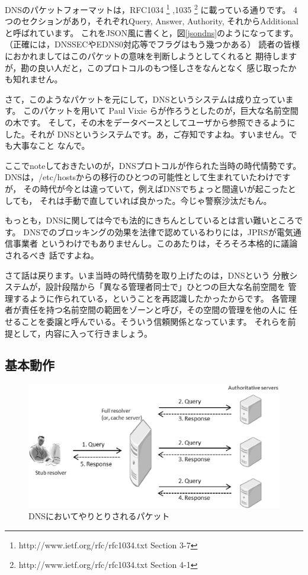 DNSのパケットフォーマットは，RFC1034
\footnote{http://www.ietf.org/rfc/rfc1034.txt Section 3-7}
,1035 
\footnote{http://www.ietf.org/rfc/rfc1034.txt Section 4-1}
に載っている通りです。
4つのセクションがあり，それぞれQuery, Answer, Authority,
それからAdditionalと呼ばれています。
これをJSON風に書くと，図\ref{jsondns}のようになってます。
（正確には，DNSSECやEDNS0対応等でフラグはもう幾つかある）
読者の皆様におかれましてはこのパケットの意味を判断しようとしてくれると
期待しますが，勘の良い人だと，このプロトコルのもつ怪しさをなんとなく
感じ取ったかも知れません。

さて，このようなパケットを元にして，DNSというシステムは成り立っています。
このパケットを用いて Paul Vixie らが作ろうとしたのが，巨大な名前空間の木です。
そして，その木をデータベースとしてユーザから参照できるようにした。それが
DNSというシステムです。あ，ご存知ですよね。すいません。でも大事なこと
なんで。

ここでnoteしておきたいのが，DNSプロトコルが作られた当時の時代情勢です。
DNSは，/etc/hostsからの移行のひとつの可能性として生まれていたわけですが，
その時代が今とは違っていて，例えばDNSでちょっと間違いが起こったとしても，
それは手動で直していれば良かった。今じゃ警察沙汰だもん。

もっとも，DNSに関しては今でも法的にきちんとしているとは言い難いところです。
DNSでのブロッキングの効果を法律で認めているわりには，JPRSが電気通信事業者
というわけでもありませんし。このあたりは，そろそろ本格的に議論されるべき
話ですよね。

さて話は戻ります。いま当時の時代情勢を取り上げたのは，DNSという
分散システムが，設計段階から「異なる管理者同士で」ひとつの巨大な名前空間を
管理するように作られている，ということを再認識したかったからです。
各管理者が責任を持つ名前空間の範囲をゾーンと呼び，その空間の管理を他の人に
任せることを委譲と呼んでいる。そういう信頼関係となっています。
それらを前提として，内容に入って行きましょう。


\subsection { 基本動作 }

\begin{figure}[b]
\centering
\includegraphics[width=\textwidth]{./suu-g/zuuu.eps}
\caption{DNSにおいてやりとりされるパケット}
\label{packet}
\end{figure}

